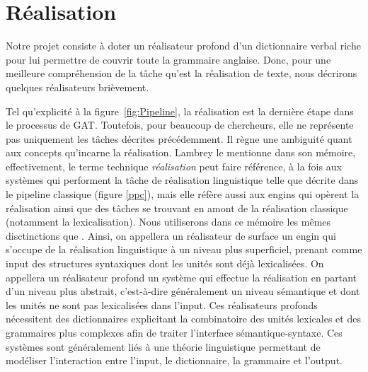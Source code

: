 

\section{Réalisation}

Notre projet consiste à doter un réalisateur profond d'un dictionnaire verbal riche pour lui permettre de couvrir toute la grammaire anglaise. Donc, pour une meilleure compréhension de la tâche qu'est la réalisation de texte, nous décrirons quelques réalisateurs brièvement.

Tel qu'explicité à la figure~\ref{fig:Pipeline}, la réalisation est la dernière étape dans le processus de \ac{GAT}. Toutefois, pour beaucoup de chercheurs, elle ne représente pas uniquement les tâches décrites précédemment. Il règne une ambiguité quant aux concepts qu'incarne la réalisation. Lambrey le mentionne \cite{LambreyImplementationcollocationspour2017} dans son mémoire, effectivement, le terme technique \emph{réalisation} peut faire référence, à la fois aux systèmes qui performent la tâche de réalisation linguistique telle que décrite dans le pipeline classique (figure \ref{ppc}), mais elle réfère aussi aux engins qui opèrent la réalisation ainsi que des tâches se trouvant en amont de la réalisation classique (notamment la lexicalisation). Nous utiliserons dans ce mémoire les mêmes disctinctions que \citep{LambreyImplementationcollocationspour2017}. Ainsi, on appellera un réalisateur de surface un engin qui s'occupe de la réalisation linguistique à un niveau plus superficiel, prenant comme input des structures syntaxiques dont les unités sont déjà lexicalisées. On appellera un réalisateur profond un système qui effectue la réalisation en partant d'un niveau plus abstrait, c'est-à-dire généralement un niveau sémantique et dont les unités ne sont pas lexicalisées dans l'input. Ces réalisateurs profonds nécessitent des dictionnaires explicitant la combinatoire des unités lexicales et des grammaires plus complexes afin de traiter l'interface sémantique-syntaxe. Ces systèmes sont généralement liés à une théorie linguistique permettant de modéliser l'interaction entre l'input, le dictionnaire, la grammaire et l'output.


